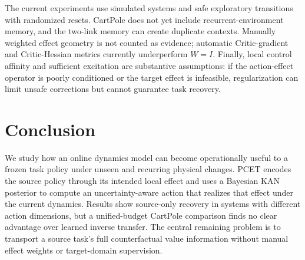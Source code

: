 \documentclass[letterpaper]{article}
\begin{document}
The current experiments use simulated systems and safe exploratory transitions
with randomized resets.  CartPole does not yet include recurrent-environment
memory, and the two-link memory can create duplicate contexts.  Manually
weighted effect geometry is not counted as evidence; automatic Critic-gradient
and Critic-Hessian metrics currently underperform $W=I$.  Finally, local control affinity and sufficient excitation
are substantive assumptions: if the action-effect operator is poorly
conditioned or the target effect is infeasible, regularization can limit
unsafe corrections but cannot guarantee task recovery.

\section{Conclusion}

We study how an online dynamics model can become operationally useful to a
frozen task policy under unseen and recurring physical changes.  PCET encodes
the source policy through its intended local effect and uses a Bayesian KAN
posterior to compute an uncertainty-aware action that realizes that effect
under the current dynamics.  Results show source-only recovery in systems with
different action dimensions, but a unified-budget CartPole comparison finds no
clear advantage over learned inverse transfer.  The central remaining problem
is to transport a source task's full counterfactual value information without
manual effect weights or target-domain supervision.


\end{document}
